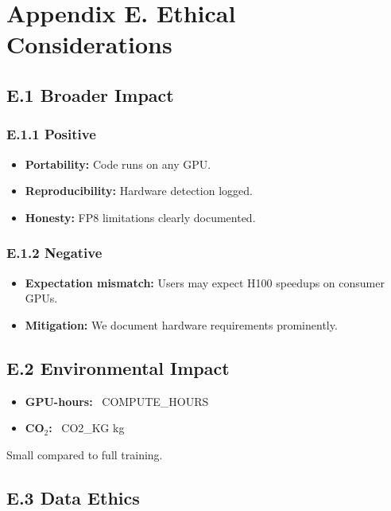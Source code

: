 
\section{Appendix E. Ethical Considerations}

\subsection{E.1 Broader Impact}

\subsubsection{E.1.1 Positive}

\begin{itemize}
\item \textbf{Portability:} Code runs on any GPU.
\item \textbf{Reproducibility:} Hardware detection logged.
\item \textbf{Honesty:} FP8 limitations clearly documented.

\end{itemize}
\subsubsection{E.1.2 Negative}

\begin{itemize}
\item \textbf{Expectation mismatch:} Users may expect H100 speedups on consumer GPUs.
\item \textbf{Mitigation:} We document hardware requirements prominently.

\end{itemize}
\subsection{E.2 Environmental Impact}

\begin{itemize}
\item \textbf{GPU-hours:} ~{{COMPUTE\_HOURS}}
\item \textbf{CO$_2$:} ~{{CO2\_KG}} kg

\end{itemize}
Small compared to full training.

\subsection{E.3 Data Ethics}

